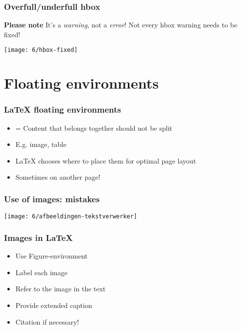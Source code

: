 \documentclass[aspectratio=169]{beamer}
\begin{document}
\begin{frame}
  \frametitle{Overfull/underfull hbox}

    \textbf{Please note} It's a \emph{warning}, not a \emph{error}! Not every hbox warning needs to be fixed!

  \centering
  \texttt{[image: 6/hbox-fixed]}

\end{frame}

\section{Floating environments}

\begin{frame}
  \frametitle{{\LaTeX} floating environments}

  \begin{itemize}
   \item = Content that belongs together should not be split
   \item E.g. image, table
   \item {\LaTeX} chooses where to place them for optimal page layout
   \item Sometimes on another page!
  \end{itemize}

\end{frame}

\begin{frame}
  \frametitle{Use of images: mistakes}

  \centering
  \texttt{[image: 6/afbeeldingen-tekstverwerker]}

\end{frame}

\begin{frame}
  \frametitle{Images in {\LaTeX}}

  \begin{itemize}
    \item Use Figure-environment
    \item Label each image
    \item Refer to the image in the text
    \item Provide extended caption
    \item Citation if necessary!
  \end{itemize}

\end{frame}
\end{document}

